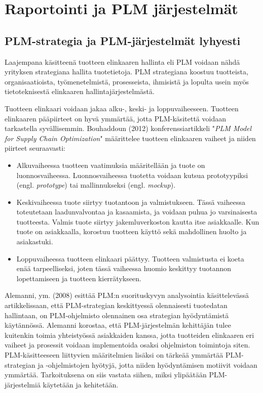 \chapter{Raportointi ja PLM järjestelmät} \label{Raportointi ja PLM järjestelmät}

\section{PLM-strategia ja PLM-järjestelmät lyhyesti} \label{PLM-järjestelmät}

Laajempana käsitteenä tuotteen elinkaaren hallinta eli PLM voidaan nähdä yrityksen strategiana hallita tuotetietoja. PLM strategiana koostuu tuotteista, organisaatioista, työmenetelmistä, prosesseista, ihmisistä ja lopulta usein myös tietoteknisestä elinkaaren hallintajärjestelmästä.

Tuotteen elinkaari voidaan jakaa alku-, keski- ja loppuvaiheeseen. Tuotteen elinkaaren pääpiirteet on hyvä ymmärtää, jotta PLM-käsitettä voidaan tarkastella syvällisemmin. Bouhaddoun (2012) konferenssiartikkeli "\textit{PLM Model for Supply Chain Optimization}" määrittelee tuotteen elinkaaren vaiheet ja niiden piirteet seuraavasti: \cite{bouhaddou_plm_2012}
\begin{itemize}
\item Alkuvaiheessa tuotteen vaatimuksia määritellään ja tuote on luonnosvaiheessa. Luonnosvaiheessa tuotetta voidaan kutsua prototyypiksi (engl. \textit{prototype}) tai mallinnukseksi (engl. \textit{mockup}).
\item Keskivaiheessa tuote siirtyy tuotantoon ja valmistukseen. Tässä vaiheessa toteutetaan laadunvalvontaa ja kasaamista, ja voidaan puhua jo varsinaisesta tuotteesta. Valmis tuote siirtyy jakemluverkoston kautta itse asiakkaalle. Kun tuote on asiakkaalla, korostuu tuotteen käyttö sekä mahdollinen huolto ja asiakastuki.
\item Loppuvaiheessa tuotteen elinkaari päättyy. Tuotteen valmistusta ei koeta enää tarpeelliseksi, joten tässä vaiheessa huomio keskittyy tuotannon lopettamiseen ja tuotteen kierrätykseen.
\end{itemize}
Alemanni, ym. (2008) esittää PLM:n suorituskyvyn analysointia käsittelevässä artikkelissaan, että PLM-strategian keskittyessä olennaisesti tuotedatan hallintaan, on PLM-ohjelmisto olennainen osa strategian hyödyntämistä käytännössä. \cite{alemanni_key_2008} Alemanni korostaa, että PLM-järjestelmän kehittäjän tulee kuitenkin toimia yhteistyössä asiakkaiden kanssa, jotta tuotteiden elinkaaren eri vaiheet ja prosessit voidaan implementoida osaksi ohjelmiston toimintoja siten. PLM-käsitteeseen liittyvien määritelmien lisäksi on tärkeää ymmärtää PLM-strategian ja -ohjelmistojen hyötyjä, jotta niiden hyödyntämisen motiivit voidaan ymmärtää. Tarkoituksena on siis vastata siihen, miksi ylipäätään PLM-järjestelmiä käytetään ja kehitetään.

